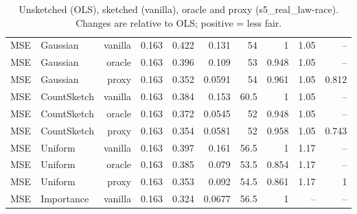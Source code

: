\begin{table}[t]
\begin{tabular}{llrrrrrrrr}
\midrule
MSE & Gaussian & vanilla & 0.163 & 0.422 & 0.131 & 54 & 1 & 1.05 & -- \\
MSE & Gaussian & oracle & 0.163 & 0.396 & 0.109 & 53 & 0.948 & 1.05 & -- \\
MSE & Gaussian & proxy & 0.163 & 0.352 & 0.0591 & 54 & 0.961 & 1.05 & 0.812 \\
MSE & CountSketch & vanilla & 0.163 & 0.384 & 0.153 & 60.5 & 1 & 1.05 & -- \\
MSE & CountSketch & oracle & 0.163 & 0.372 & 0.0545 & 52 & 0.948 & 1.05 & -- \\
MSE & CountSketch & proxy & 0.163 & 0.354 & 0.0581 & 52 & 0.958 & 1.05 & 0.743 \\
MSE & Uniform & vanilla & 0.163 & 0.397 & 0.161 & 56.5 & 1 & 1.17 & -- \\
MSE & Uniform & oracle & 0.163 & 0.385 & 0.079 & 53.5 & 0.854 & 1.17 & -- \\
MSE & Uniform & proxy & 0.163 & 0.353 & 0.092 & 54.5 & 0.861 & 1.17 & 1 \\
MSE & Importance & vanilla & 0.163 & 0.324 & 0.0677 & 56.5 & 1 & -- & -- \\
\bottomrule
\end{tabular}
\caption{Unsketched (OLS), sketched (vanilla), oracle and proxy (s5_real_law-race). Changes are relative to OLS; positive = less fair.}
\label{tab:strat_s5_real_law-race}
\end{table}